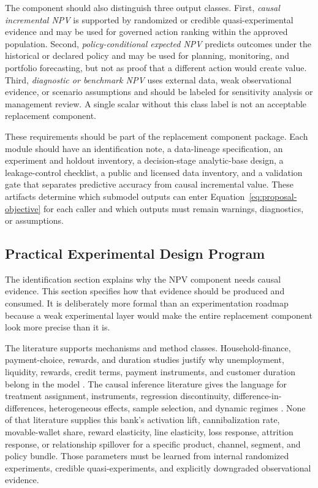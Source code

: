 \documentclass[11pt]{article}
\newcommand{\1}{\mathbf{1}}
\begin{document}
The component should also distinguish three output classes. First,
\emph{causal incremental NPV} is supported by randomized or credible
quasi-experimental evidence and may be used for governed action ranking within
the approved population. Second, \emph{policy-conditional expected NPV}
predicts outcomes under the historical or declared policy and may be used for
planning, monitoring, and portfolio forecasting, but not as proof that a
different action would create value. Third, \emph{diagnostic or benchmark NPV}
uses external data, weak observational evidence, or scenario assumptions and
should be labeled for sensitivity analysis or management review. A single
scalar without this class label is not an acceptable replacement component.

These requirements should be part of the replacement component package. Each
module should have an identification note, a data-lineage specification, an
experiment and holdout inventory, a decision-stage analytic-base design, a
leakage-control checklist, a public and licensed data inventory, and a
validation gate that separates predictive accuracy from causal incremental
value. These artifacts determine which submodel outputs can enter
Equation~\eqref{eq:proposal-objective} for each caller and which outputs must
remain warnings, diagnostics, or assumptions.

\subsection{Practical Experimental Design Program}
\label{sec:experimental-design-program}

The identification section explains why the NPV component needs causal
evidence. This section specifies how that evidence should be produced and
consumed. It is deliberately more formal than an experimentation roadmap
because a weak experimental layer would make the entire replacement component
look more precise than it is.

The literature supports mechanisms and method classes. Household-finance,
payment-choice, rewards, and duration studies justify why unemployment,
liquidity, rewards, credit terms, payment instruments, and customer duration
belong in the model
\citep{gross2001liquidity,koulayev2012payment,agarwal2010rewards,
prelec2001creditcard,ganong2019unemployment,johnson2004rebates,
schmittlein1987counting,fader2005bgnbd,bolton1998duration}. The causal
inference literature gives the language for treatment assignment, instruments,
regression discontinuity, difference-in-differences, heterogeneous effects,
sample selection, and dynamic regimes
\citep{rosenbaum1983propensity,imbensrubin2015causal,
angristimbensrubin1996iv,lee2010rd,callaway2021did,sun2021eventstudy,
wager2018causalforests,chernozhukov2018dml,heckman1979selection,
murphy2003dynamic,puterman1994mdp}. None of that literature supplies this
bank's activation lift, cannibalization rate, movable-wallet share, reward
elasticity, line elasticity, loss response, attrition response, or relationship
spillover for a specific product, channel, segment, and policy bundle. Those
parameters must be learned from internal randomized experiments, credible
quasi-experiments, and explicitly downgraded observational evidence.
\end{document}

